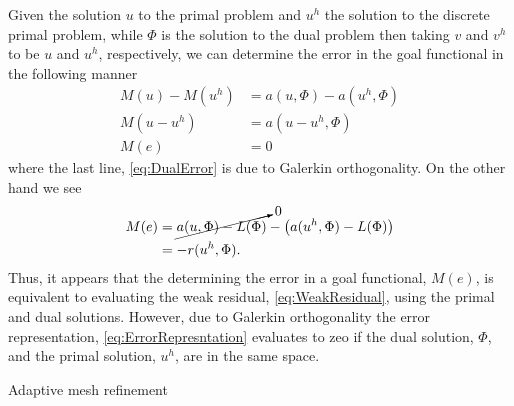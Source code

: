 Given the solution $u$ to the primal problem and $u^h$ the solution to the
discrete primal problem, while $\Phi$ is the solution to the dual problem then
taking $v$ and $v^h$ to be $u$ and $u^h$, respectively, we can determine the
error in the goal functional in the following manner
\begin{align}
    M(u) - M(u^h) &= a(u, \Phi) - a(u^h, \Phi) \nonumber \\
    M(u - u^h) &= a(u - u^h, \Phi) \nonumber \\
    M(e) &= 0 \label{eq:DualError}
\end{align}
where the last line, \eqref{eq:DualError} is due to Galerkin orthogonality. On
the other hand we see
\begin{align}
    M(e) & = \cancelto{0}{a(u, \Phi) - L(\Phi)}
             - \left( a(u^h, \Phi) - L(\Phi) \right) \nonumber \\
    &= -r(u^h, \Phi). \label{eq:ErrorRepresentation}
\end{align}
Thus, it appears that the determining the error in a goal functional, $M(e)$, is
equivalent to evaluating the weak residual, \eqref{eq:WeakResidual}, using the
primal and dual solutions. However, due to Galerkin orthogonality the error
representation, \eqref{eq:ErrorRepresntation} evaluates to zeo if the
dual solution, $\Phi$, and the primal solution, $u^h$, are in the same space.

\begin{algorithm}[!htp]
\begin{minipage}[t]{\columnwidth} %
  \caption{Adaptive mesh refinement} \label{alg:Adaptivity}
   \vspace{0.5em}
  \SetAlgoLined
\end{minipage}
\end{algorithm}

